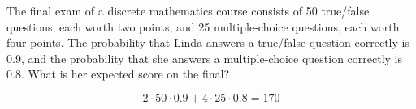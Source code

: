 \documentclass[../main.tex]{subfiles}
\begin{document}
The final exam of a discrete mathematics course consists of 50 true/false questions, each worth two points, and 25 multiple-choice questions, each worth four points.
The probability that Linda answers a true/false question correctly is 0.9, and the probability that she answers a multiple-choice question correctly is 0.8.
What is her expected score on the final?

\solution

\[ 2 \cdot 50 \cdot 0.9 + 4 \cdot 25 \cdot 0.8 = 170 \]
\end{document}
